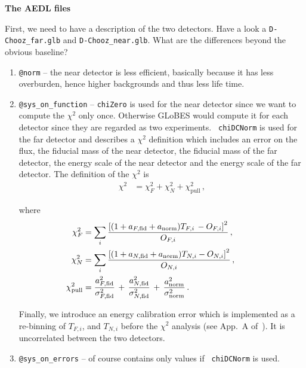 \documentclass[12pt,a4paper]{article}
\newcommand{\aufg}[1]{\vspace{4mm}{\bf\underline{Problem #1:}}\vspace{3mm}}
\begin{document}
\aufg{1} {\bf The AEDL files}

First, we need to have a description of the two detectors. Have a look
a {\tt D-Chooz\_far.glb} and {\tt D-Chooz\_near.glb}. What are the
differences beyond the obvious baseline?

\begin{enumerate}
\item {\tt @norm} -- the near detector is less efficient, basically
  because it has less overburden, hence higher backgrounds and thus
  less life time.
\item {\tt @sys\_on\_function} -- {\tt chiZero} is used for the near
  detector since we want to compute the $\chi^2$ only once.
  Otherwise GLoBES would compute it for each detector since they are
  regarded as two experiments. {\tt
    chiDCNorm} is used for the far detector and describes a $\chi^2$
  definition which includes an error on the flux, the fiducial mass of
  the near detector, the fiducial mass of the far detector, the energy
  scale of the near detector and the energy scale of the far detector.
The definition of the $\chi^2$ is
\begin{align}
  \chi^2 &= \chi^2_{F} + \chi^2_{N} + \chi^2_\mathrm{pull}
\, ,
  \label{eq:chi2total}
\end{align}

where
\begin{align}
  \hspace{-1 cm} \chi^2_{F} &= \sum_i
     \frac{\left[ (1 + a_{F,\rm fid} + a_{\rm norm} ) T_{
F,i}\, - O_{F,i} \right]^2}{O_{F,i}} \, , \label{eq:chi2F1} \\
  \hspace{-1 cm} \chi^2_{N} &= \sum_i
    \frac{\left[ (1 + a_{N,\rm fid} + a_{\rm norm}) T_{N,i
}
        - O_{N,i} \right]^2}{O_{N,i}}     \, ,    \label{eq:chi2N2} \\
  \hspace{-1 cm} \chi^2_\mathrm{pull} &= \frac{a_{F,\rm fid}^2}{\sigma_{F,\rm fi
d}^2}
       \, +\, \frac{a_{N,\rm fid}^2}{\sigma_{N,\rm fid}^2}
       \, +\, \frac{a_{\rm norm}^2}{\sigma_{\rm norm}^2} \, .
       \label{eq:chi2pull}
\end{align}

Finally, we introduce an energy calibration error which is implemented
as a re-binning of $T_{F,i}$, and $T_{N,i}$ before
the $\chi^2$ analysis (see App.~A of~\cite{Huber:2003pm}). It is uncorrelated
between the two detectors.

\item {\tt @sys\_on\_errors} -- of course contains only values if {\tt
    chiDCNorm} is used.
\end{enumerate}
\end{document}
